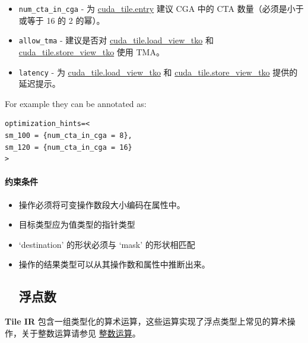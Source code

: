 \documentclass{article}
\begin{document}
\begin{itemize}
\item \texttt{num\_cta\_in\_cga} - 为 \href{https://docs.nvidia.com/cuda/tile-ir/latest/sections/operations.html#op-cuda-tile-entry}{cuda\_tile.entry} 建议 CGA 中的 CTA 数量（必须是小于或等于 16 的 2 的幂）。
\item \texttt{allow\_tma} - 建议是否对 \href{https://docs.nvidia.com/cuda/tile-ir/latest/sections/operations.html#op-cuda-tile-load-view-tko}{cuda\_tile.load\_view\_tko} 和 \href{https://docs.nvidia.com/cuda/tile-ir/latest/sections/operations.html#op-cuda-tile-store-view-tko}{cuda\_tile.store\_view\_tko} 使用 TMA。
\item \texttt{latency} - 为 \href{https://docs.nvidia.com/cuda/tile-ir/latest/sections/operations.html#op-cuda-tile-load-view-tko}{cuda\_tile.load\_view\_tko} 和 \href{https://docs.nvidia.com/cuda/tile-ir/latest/sections/operations.html#op-cuda-tile-store-view-tko}{cuda\_tile.store\_view\_tko} 提供的延迟提示。

\end{itemize}
For example they can be annotated as:


\begin{lstlisting}
optimization_hints=<
sm_100 = {num_cta_in_cga = 8},
sm_120 = {num_cta_in_cga = 16}
>
\end{lstlisting}


\paragraph{约束条件}

\begin{itemize}
\item 操作必须将可变操作数段大小编码在属性中。
\item 目标类型应为值类型的指针类型
\item `destination' 的形状必须与 `mask' 的形状相匹配
\item 操作的结果类型可以从其操作数和属性中推断出来。



\subsection{浮点数}

\end{itemize}
\textbf{Tile IR} 包含一组类型化的算术运算，这些运算实现了浮点类型上常见的算术操作，关于整数运算请参见 \href{https://docs.nvidia.com/cuda/tile-ir/latest/sections/operations.html#op-group-integer}{整数运算}。
\end{document}
